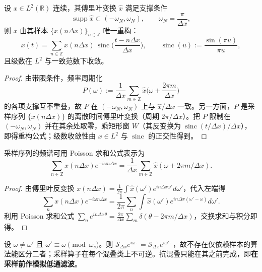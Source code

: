 \begin{theorem}\label{thm:nyquist_shannon_parallel}
设 $x\in L^2(\mathbb{R})$ 连续，其傅里叶变换 $\hat x$ 满足支撑条件
\[
\operatorname{supp}\hat x\subset(-\omega_N,\omega_N),\qquad \omega_N=\frac{\pi}{\Delta x},
\]
则 $x$ 由其样本 $\{x(n\Delta x)\}_{n\in\mathbb{Z}}$ 唯一重构：
\[
x(t)=\sum_{n\in\mathbb{Z}}x(n\Delta x)\,\operatorname{sinc}\!\Big(\frac{t-n\Delta x}{\Delta x}\Big),
\qquad
\operatorname{sinc}(u):=\frac{\sin(\pi u)}{\pi u},
\]
且级数在 $L^2$ 与一致范数下收敛。
\end{theorem}

\begin{proof}
由带限条件，频率周期化
\[
P(\omega):=\frac{1}{\Delta x}\sum_{m\in\mathbb{Z}}\hat x\Big(\omega+\frac{2\pi m}{\Delta x}\Big)
\]
的各项支撑互不重叠，故 $P$ 在 $(-\omega_N,\omega_N)$ 上与 $\hat x/\Delta x$ 一致。另一方面，$P$ 是采样序列 $\{x(n\Delta x)\}$ 的离散时间傅里叶变换（周期 $2\pi/\Delta x$）。把 $P$ 限制在 $(-\omega_N,\omega_N)$ 并在其余处取零，乘矩形窗 $W$（其反变换为 $\operatorname{sinc}(t/\Delta x)/\Delta x$），即得重构公式；级数收敛性由 $x\in L^2$ 与 $\operatorname{sinc}$ 的正交性得到。
\end{proof}

\begin{lemma}\label{lem:poisson_summation_sampling}
采样序列的频谱可用 Poisson 求和公式表示为
\[
\sum_{n\in\mathbb{Z}}x(n\Delta x)e^{-i\omega n\Delta x}
=\frac{1}{\Delta x}\sum_{m\in\mathbb{Z}}\hat x(\omega+2\pi m/\Delta x).
\]
\end{lemma}

\begin{proof}
由傅里叶反变换 $x(n\Delta x)=\frac{1}{2\pi}\int\hat x(\omega')e^{in\Delta x\omega'}d\omega'$，代入左端得
\[
\sum_n x(n\Delta x)e^{-i\omega n\Delta x}=\frac{1}{2\pi}\sum_n\int\hat x(\omega')e^{in\Delta x(\omega'-\omega)}d\omega'.
\]
利用 Poisson 求和公式 $\sum_ne^{in\Delta x\theta}=\frac{2\pi}{\Delta x}\sum_m\delta(\theta-2\pi m/\Delta x)$，交换求和与积分即得。
\end{proof}

\begin{corollary}[混叠的不可逆性]\label{cor:aliasing_irreversibility_parallel}
设 $\omega\ne\omega'$ 且 $\omega'\equiv\omega\pmod{\omega_s}$。则 $\mathcal{S}_{\Delta x}e^{i\omega\cdot}=\mathcal{S}_{\Delta x}e^{i\omega'\cdot}$，故不存在仅依赖样本的算法能区分二者；采样算子在每个混叠类上不可逆。抗混叠只能在其之前完成，即\textbf{在采样前作模拟低通滤波}。
\end{corollary}

